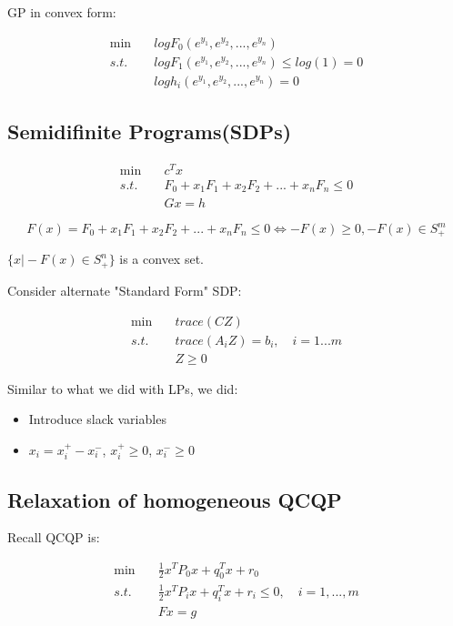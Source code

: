 GP in convex form:

\begin{align*}
\min\quad & logF_0(e^{y_1},e^{y_2},...,e^{y_n}) \\
s.t. \quad& logF_1(e^{y_1},e^{y_2},...,e^{y_n}) \leq log(1) = 0\\
&log h_i(e^{y_1},e^{y_2},...,e^{y_n}) = 0
\end{align*}




\subsection{Semidifinite Programs(SDPs)}
\begin{align*}
\min \quad&c^Tx \\
s.t. \quad&F_0 + x_1F_1 + x_2F_2 + ... + x_nF_n \leq 0\\
&Gx = h
\end{align*}

\begin{equation*}
F(x) = F_0 + x_1F_1 + x_2F_2 + ... + x_nF_n  \leq 0 \Leftrightarrow -F(x) \geq 0, -F(x) \in S_+^m
\end{equation*}

$\{x\vert -F(x)\in S^n_+ \}$ is a convex set. 

Consider alternate "Standard Form" SDP:

\begin{align*}
\min \quad&trace(CZ) \\
s.t. \quad&trace(A_iZ) = b_i, \quad i = 1...m\\
&Z\geq 0
\end{align*}

Similar to what we did with LPs, we did:

\begin{itemize}
	\item Introduce slack variables
	
	\item $x_i = x_i^+ - x_i^-$, $x_i^+\geq 0$, $x_i^-\geq 0$
\end{itemize}

\subsection{Relaxation of homogeneous QCQP}

Recall QCQP is: 

\begin{align*}
\min \quad&\frac{1}{2}x^TP_0x + q_0^Tx + r_0 \\
s.t. \quad&\frac{1}{2}x^TP_ix + q_i^Tx + r_i\leq 0,\quad i = 1,...,m\\
&Fx = g
\end{align*}


